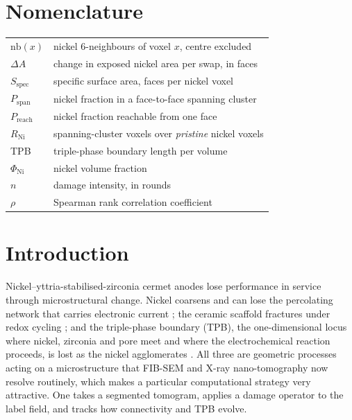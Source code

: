 \documentclass[5p,times,twocolumn]{elsarticle}
\newcommand{\Rni}{R_{\mathrm{Ni}}}
\newcommand{\Pspan}{P_{\mathrm{span}}}
\newcommand{\Preach}{P_{\mathrm{reach}}}
\newcommand{\Sspec}{S_{\mathrm{spec}}}
\newcommand{\nb}{\mathrm{nb}}
\begin{document}
\section*{Nomenclature}

\begingroup\small
\begin{tabular}{@{}l@{\hspace{0.9em}}p{}@{}}
$\nb(x)$ & nickel 6-neighbours of voxel $x$, centre excluded \\
$\Delta A$ & change in exposed nickel area per swap, in faces \\
$\Sspec$ & specific surface area, faces per nickel voxel \\
$\Pspan$ & nickel fraction in a face-to-face spanning cluster \\
$\Preach$ & nickel fraction reachable from one face \\
$\Rni$ & spanning-cluster voxels over \emph{pristine} nickel voxels \\
TPB & triple-phase boundary length per volume \\
$\Phi_{\mathrm{Ni}}$ & nickel volume fraction \\
$n$ & damage intensity, in rounds \\
$\rho$ & Spearman rank correlation coefficient \\
\end{tabular}
\endgroup



\section{Introduction}

Nickel--yttria-stabilised-zirconia cermet anodes lose performance in service
through microstructural change. Nickel coarsens and can lose the percolating
network that carries electronic current \cite{simwonis2000}; the ceramic
scaffold fractures under redox cycling \cite{sarantaridis2007}; and the
triple-phase boundary (TPB), the one-dimensional locus where nickel, zirconia
and pore meet and where the electrochemical reaction proceeds, is lost as the
nickel agglomerates \cite{monaco2019}. All three are geometric
processes acting on a
microstructure that FIB-SEM and X-ray nano-tomography now resolve routinely,
which makes a particular computational strategy very attractive. One takes a
segmented tomogram, applies a damage operator to the label field, and tracks
how connectivity and TPB evolve.
\end{document}
